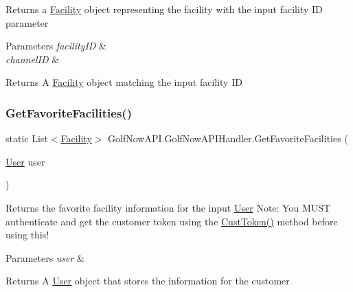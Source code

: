 Returns a \mbox{\hyperlink{class_golf_now_a_p_i_1_1_facility}{Facility}} object representing the facility with the input facility ID parameter 


\begin{DoxyParams}{Parameters}
{\em facility\+ID} & \\
\hline
{\em channel\+ID} & \\
\hline
\end{DoxyParams}
\begin{DoxyReturn}{Returns}
A \mbox{\hyperlink{class_golf_now_a_p_i_1_1_facility}{Facility}} object matching the input facility ID
\end{DoxyReturn}
\mbox{\label{class_golf_now_a_p_i_1_1_golf_now_a_p_i_handler_ad54388536fbf87a169d8fb8f7fe940e1}} 
\subsubsection{\texorpdfstring{GetFavoriteFacilities()}{GetFavoriteFacilities()}}
{\footnotesize\ttfamily static List$<$\mbox{\hyperlink{class_golf_now_a_p_i_1_1_facility}{Facility}}$>$ Golf\+Now\+A\+P\+I.\+Golf\+Now\+A\+P\+I\+Handler.\+Get\+Favorite\+Facilities (\begin{DoxyParamCaption}\item[{\mbox{\hyperlink{class_golf_now_a_p_i_1_1_user}{User}}}]{user }\end{DoxyParamCaption})\hspace{0.3cm}{\ttfamily [static]}}



Returns the favorite facility information for the input \mbox{\hyperlink{class_golf_now_a_p_i_1_1_user}{User}} Note\+: You M\+U\+ST authenticate and get the customer token using the \mbox{\hyperlink{class_golf_now_a_p_i_1_1_golf_now_a_p_i_handler_ae2f95c14f042ab3008642f30b0b93e36}{Cust\+Token()}} method before using this! 


\begin{DoxyParams}{Parameters}
{\em user} & \\
\hline
\end{DoxyParams}
\begin{DoxyReturn}{Returns}
A \mbox{\hyperlink{class_golf_now_a_p_i_1_1_user}{User}} object that stores the information for the customer
\end{DoxyReturn}
\mbox{\label{class_golf_now_a_p_i_1_1_golf_now_a_p_i_handler_a99d2a8b9ee4da0a3bd0bcf4274b8ee53}} 
